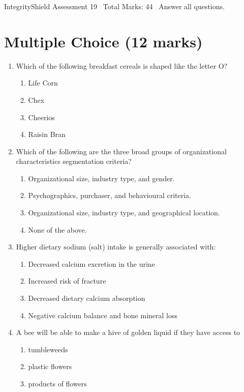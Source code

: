 \documentclass[12pt]{article}
\begin{document}
\begin{center}
IntegrityShield Assessment 19 \
Total Marks: 44 \
Answer all questions.
\end{center}

\section*{Multiple Choice (12 marks)}
\begin{enumerate}[label=\arabic*.]
\item Which of the following breakfast cereals is shaped like the letter O?
\begin{enumerate}[label=(\alph*)]
    \item Life Corn
    \item Chex
    \item Cheerios
    \item Raisin Bran
\end{enumerate}
\item Which of the following are the three broad groups of organizational characteristics segmentation criteria?
\begin{enumerate}[label=(\alph*)]
    \item Organizational size, industry type, and gender.
    \item Psychographics, purchaser, and behavioural criteria.
    \item Organizational size, industry type, and geographical location.
    \item None of the above.
\end{enumerate}
\item Higher dietary sodium (salt) intake is generally associated with:
\begin{enumerate}[label=(\alph*)]
    \item Decreased calcium excretion in the urine
    \item Increased risk of fracture
    \item Decreased dietary calcium absorption
    \item Negative calcium balance and bone mineral loss
\end{enumerate}
\item A bee will be able to make a hive of golden liquid if they have access to
\begin{enumerate}[label=(\alph*)]
    \item tumbleweeds
    \item plastic flowers
    \item products of flowers

\end{enumerate}
\end{enumerate}
\end{document}

